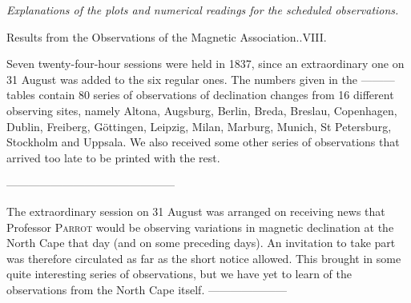 \begin{center}\large\textit{Explanations of the plots and numerical readings for the scheduled observations.}\par
[\textit{An excerpt.}]\end{center}
\begin{center}\small Results from the Observations of the Magnetic Association..\quad VIII.\end{center}

Seven twenty-four-hour sessions were held in 1837, since an extraordinary one on 31 August was added to the six regular ones. The numbers given in the ---\quad---\quad--- tables contain 80 series of observations of declination changes from 16 different observing sites, namely Altona, Augsburg, Berlin, Breda, Breslau, Copenhagen, Dublin, Freiberg, Göttingen, Leipzig, Milan, Marburg, Munich, St Petersburg, Stockholm and Uppsala. We also received some other series of observations that arrived too late to be printed with the rest.
\begin{center}\small
---\enspace---\enspace---\enspace---\enspace---\enspace---\enspace---\enspace---\enspace---\enspace---\enspace---\enspace---\enspace---\enspace---\enspace---
\end{center}
The extraordinary session on 31 August was arranged on receiving news that Professor \textsc{Parrot} would be observing variations in magnetic declination at the North Cape that day (and on some preceding days). An invitation to take part was therefore circulated as far as the short notice allowed. This brought in some quite interesting series of observations, but we have yet to learn of the observations from the North Cape itself. ---\quad---\quad---\quad---\quad---\quad---\quad---

